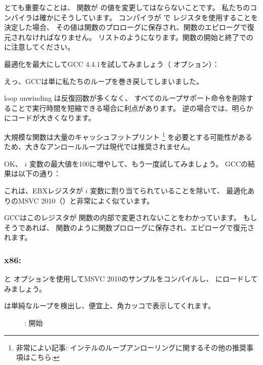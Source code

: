 とても重要なことは、 \ttf 関数が \ESI の値を変更してはならないことです。 
私たちのコンパイラは確かにそうしています。
コンパイラが \ttf で \ESI レジスタを使用することを決定した場合、
その値は関数のプロローグに保存され、関数のエピローグで復元されなければなりません。
リストのようになります。関数の開始と終了でのに注意してください。

最適化を最大にしてGCC 4.4.1を試してみましょう（ \Othree オプション）：




えっ、GCCは単に私たちのループを巻き戻してしまいました。

\Gls{loop unwinding} は反復回数が多くなく、
すべてのループサポート命令を削除することで実行時間を短縮できる場合に利点があります。 
逆の場合では、明らかにコードが大きくなります。

大規模な関数は大量のキャッシュフットプリント%
%
\footnote{非常によい記事: \DrepperMemory 
インテルのループアンローリングに関するその他の推奨事項はこちら:
}
を必要とする可能性があるため、大きなアンロールループは現代では推奨されません。

OK、 $i$ 変数の最大値を100に増やして、もう一度試してみましょう。 GCCの結果は以下の通り：



これは、EBXレジスタが $i$ 変数に割り当てられていることを除いて、
最適化ありのMSVC 2010（\Ox）と非常によく似ています。

GCCはこのレジスタが \ttf 関数の内部で変更されないことをわかっています。
もしそうであれば、 \main 関数のように関数プロローグに保存され、エピローグで復元されます。

\clearpage
\subsubsection{x86: \olly}
\myindex{\olly}

\Ox と \Obzero オプションを使用してMSVC 2010のサンプルをコンパイルし、 
\olly にロードしてみましょう。

\olly は単純なループを検出し、便宜上、角カッコで表示してくれます。

\begin{figure}[H]
\centering
{}
\caption{\olly: \main 開始}
\label{fig:loops_olly_1}
\end{figure}

